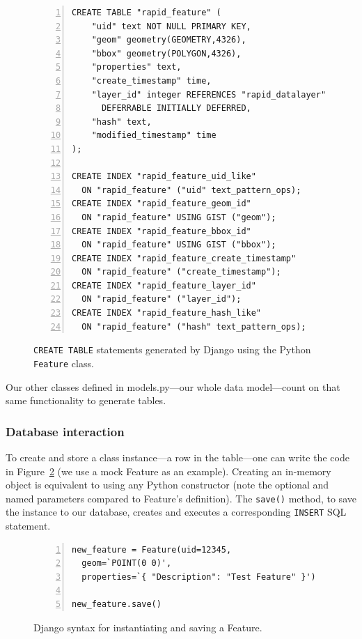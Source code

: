 
\begin{figure}[ht]
\begin{Verbatim}[samepage=true,baselinestretch=1,numbers=left,xleftmargin=12mm]
CREATE TABLE "rapid_feature" (
    "uid" text NOT NULL PRIMARY KEY,
    "geom" geometry(GEOMETRY,4326),
    "bbox" geometry(POLYGON,4326),
    "properties" text,
    "create_timestamp" time,
    "layer_id" integer REFERENCES "rapid_datalayer" ("uid")
      DEFERRABLE INITIALLY DEFERRED,
    "hash" text,
    "modified_timestamp" time
);

CREATE INDEX "rapid_feature_uid_like"
  ON "rapid_feature" ("uid" text_pattern_ops);
CREATE INDEX "rapid_feature_geom_id"
  ON "rapid_feature" USING GIST ("geom");
CREATE INDEX "rapid_feature_bbox_id"
  ON "rapid_feature" USING GIST ("bbox");
CREATE INDEX "rapid_feature_create_timestamp"
  ON "rapid_feature" ("create_timestamp");
CREATE INDEX "rapid_feature_layer_id"
  ON "rapid_feature" ("layer_id");
CREATE INDEX "rapid_feature_hash_like"
  ON "rapid_feature" ("hash" text_pattern_ops);
\end{Verbatim}
\caption{\texttt{CREATE TABLE} statements generated by Django using the Python \texttt{Feature} class.}
\label{fig:sql}
\end{figure}

Our other classes defined in models.py---our whole data model---count on that same functionality to generate tables.

\subsubsection{Database interaction}
To create and store a class instance---a row in the table---one can write the code in Figure~\ref{fig:save} (we use a mock Feature as an example). Creating an in-memory object is equivalent to using any Python constructor (note the optional and named parameters compared to Feature's definition). The \texttt{save()} method, to save the instance to our database, creates and executes a corresponding \texttt{INSERT} SQL statement.

\begin{figure}[ht]
\begin{Verbatim}[samepage=true,baselinestretch=1,numbers=left,xleftmargin=12mm]
new_feature = Feature(uid=12345,
  geom=`POINT(0 0)',
  properties=`{ "Description": "Test Feature" }')
  
new_feature.save()
\end{Verbatim}
\vspace{-18pt}
\caption{Django syntax for instantiating and saving a Feature.}
\vspace{8pt}
\label{fig:save}
\end{figure}

